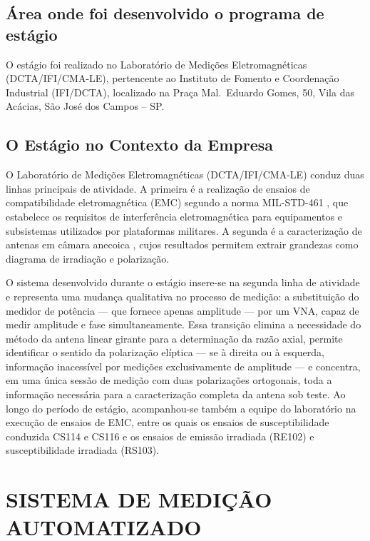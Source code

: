 \documentclass[12pt, a4paper]{article}
\begin{document}
\subsection{Área onde foi desenvolvido o programa de estágio}

O estágio foi realizado no Laboratório de Medições Eletromagnéticas
(DCTA/IFI/CMA-LE), pertencente ao Instituto de Fomento e Coordenação
Industrial (IFI/DCTA), localizado na Praça Mal.\ Eduardo Gomes, 50,
Vila das Acácias, São José dos Campos -- SP.

\subsection{O Estágio no Contexto da Empresa}

O Laboratório de Medições Eletromagnéticas (DCTA/IFI/CMA-LE) conduz duas linhas principais de atividade. A primeira é a realização de ensaios de compatibilidade eletromagnética (EMC) segundo a norma MIL-STD-461 \citep{milstd461}, que estabelece os requisitos de interferência eletromagnética para equipamentos e subsistemas utilizados por plataformas militares. A segunda é a caracterização de antenas em câmara anecoica \citep{oliveira2020}, cujos resultados permitem extrair grandezas como diagrama de irradiação e polarização.

O sistema desenvolvido durante o estágio insere-se na segunda linha de atividade e representa uma mudança qualitativa no processo de medição: a substituição do medidor de potência --- que fornece apenas amplitude --- por um VNA, capaz de medir amplitude e fase simultaneamente. Essa transição elimina a necessidade do método da antena linear girante \citep{ieee149_2021} para a determinação da razão axial, permite identificar o sentido da polarização elíptica --- se à direita ou à esquerda, informação inacessível por medições exclusivamente de amplitude --- e concentra, em uma única sessão de medição com duas polarizações ortogonais, toda a informação necessária para a caracterização completa da antena sob teste. Ao longo do período de estágio, acompanhou-se também a equipe do laboratório na execução de ensaios de EMC, entre os quais os ensaios de susceptibilidade conduzida CS114 e CS116 e os ensaios de emissão irradiada (RE102) e susceptibilidade irradiada (RS103).

\section{SISTEMA DE MEDIÇÃO AUTOMATIZADO}
\end{document}
